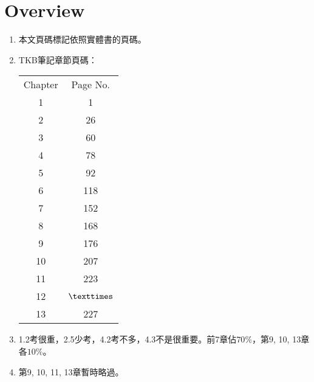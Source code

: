 \section{Overview}

\begin{enumerate}
    \item 本文頁碼標記依照實體書\cite{1}\cite{2}\cite{3}的頁碼。
    \item TKB筆記\cite{4}章節頁碼：
    \begin{table}[H]
        \centering
        \begin{tabular}{|c|c|}
            \hline
            Chapter & Page No. \\
            \Xhline{2\arrayrulewidth}
            1 & 1 \\
            \hline
            2 & 26 \\
            \hline
            3 & 60 \\
            \hline
            4 & 78 \\
            \hline
            5 & 92 \\
            \hline
            6 & 118 \\
            \hline
            7 & 152 \\
            \hline
            8 & 168 \\
            \hline
            9 & 176 \\
            \hline
            10 & 207 \\
            \hline
            11 & 223 \\
            \hline
            12 & $\texttimes$ \\
            \hline
            13 & 227 \\
            \hline
        \end{tabular}
    \end{table}
    \item 1.2考很重，2.5少考，4.2考不多，4.3不是很重要。前7章佔$70\%$，第9, 10, 13章各$10\%$。
    \item 第9, 10, 11, 13章暫時略過。
\end{enumerate}

\pagebreak